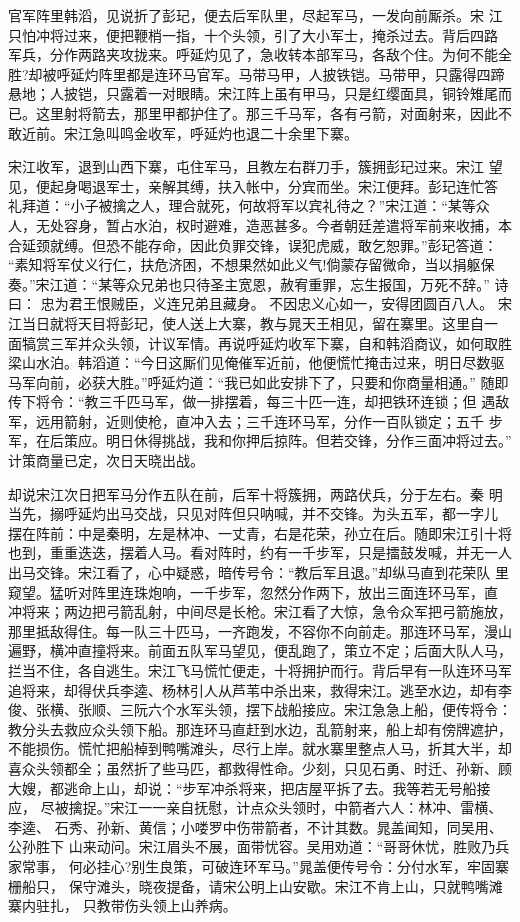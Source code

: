 官军阵里韩滔，见说折了彭玘，便去后军队里，尽起军马，一发向前厮杀。宋
江只怕冲将过来，便把鞭梢一指，十个头领，引了大小军士，掩杀过去。背后四路
军兵，分作两路夹攻拢来。呼延灼见了，急收转本部军马，各敌个住。为何不能全
胜?却被呼延灼阵里都是连环马官军。马带马甲，人披铁铠。马带甲，只露得四蹄
悬地；人披铠，只露着一对眼睛。宋江阵上虽有甲马，只是红缨面具，铜铃雉尾而
已。这里射将箭去，那里甲都护住了。那三千马军，各有弓箭，对面射来，因此不
敢近前。宋江急叫鸣金收军，呼延灼也退二十余里下寨。

宋江收军，退到山西下寨，屯住军马，且教左右群刀手，簇拥彭玘过来。宋江
望见，便起身喝退军士，亲解其缚，扶入帐中，分宾而坐。宋江便拜。彭玘连忙答
礼拜道：“小子被擒之人，理合就死，何故将军以宾礼待之？”宋江道：“某等众
人，无处容身，暂占水泊，权时避难，造恶甚多。今者朝廷差遣将军前来收捕，本
合延颈就缚。但恐不能存命，因此负罪交锋，误犯虎威，敢乞恕罪。”彭玘答道：
“素知将军仗义行仁，扶危济困，不想果然如此义气!倘蒙存留微命，当以捐躯保
奏。”宋江道：“某等众兄弟也只待圣主宽恩，赦宥重罪，忘生报国，万死不辞。”
诗曰：
忠为君王恨贼臣，义连兄弟且藏身。
不因忠义心如一，安得团圆百八人。
宋江当日就将天目将彭玘，使人送上大寨，教与晁天王相见，留在寨里。这里自一
面犒赏三军并众头领，计议军情。再说呼延灼收军下寨，自和韩滔商议，如何取胜
梁山水泊。韩滔道：“今日这厮们见俺催军近前，他便慌忙掩击过来，明日尽数驱
马军向前，必获大胜。”呼延灼道：“我已如此安排下了，只要和你商量相通。”
随即传下将令：“教三千匹马军，做一排摆着，每三十匹一连，却把铁环连锁；但
遇敌军，远用箭射，近则使枪，直冲入去；三千连环马军，分作一百队锁定；五千
步军，在后策应。明日休得挑战，我和你押后掠阵。但若交锋，分作三面冲将过去。”
计策商量已定，次日天晓出战。

却说宋江次日把军马分作五队在前，后军十将簇拥，两路伏兵，分于左右。秦
明当先，搦呼延灼出马交战，只见对阵但只呐喊，并不交锋。为头五军，都一字儿
摆在阵前：中是秦明，左是林冲、一丈青，右是花荣，孙立在后。随即宋江引十将
也到，重重迭迭，摆着人马。看对阵时，约有一千步军，只是擂鼓发喊，并无一人
出马交锋。宋江看了，心中疑惑，暗传号令：“教后军且退。”却纵马直到花荣队
里窥望。猛听对阵里连珠炮响，一千步军，忽然分作两下，放出三面连环马军，直
冲将来；两边把弓箭乱射，中间尽是长枪。宋江看了大惊，急令众军把弓箭施放，
那里抵敌得住。每一队三十匹马，一齐跑发，不容你不向前走。那连环马军，漫山
遍野，横冲直撞将来。前面五队军马望见，便乱跑了，策立不定；后面大队人马，
拦当不住，各自逃生。宋江飞马慌忙便走，十将拥护而行。背后早有一队连环马军
追将来，却得伏兵李逵、杨林引人从芦苇中杀出来，救得宋江。逃至水边，却有李
俊、张横、张顺、三阮六个水军头领，摆下战船接应。宋江急急上船，便传将令：
教分头去救应众头领下船。那连环马直赶到水边，乱箭射来，船上却有傍牌遮护，
不能损伤。慌忙把船棹到鸭嘴滩头，尽行上岸。就水寨里整点人马，折其大半，却
喜众头领都全；虽然折了些马匹，都救得性命。少刻，只见石勇、时迁、孙新、顾
大嫂，都逃命上山，却说：“步军冲杀将来，把店屋平拆了去。我等若无号船接应，
尽被擒捉。”宋江一一亲自抚慰，计点众头领时，中箭者六人：林冲、雷横、李逵、
石秀、孙新、黄信；小喽罗中伤带箭者，不计其数。晁盖闻知，同吴用、公孙胜下
山来动问。宋江眉头不展，面带忧容。吴用劝道：“哥哥休忧，胜败乃兵家常事，
何必挂心?别生良策，可破连环军马。”晁盖便传号令：分付水军，牢固寨栅船只，
保守滩头，晓夜提备，请宋公明上山安歇。宋江不肯上山，只就鸭嘴滩寨内驻扎，
只教带伤头领上山养病。

